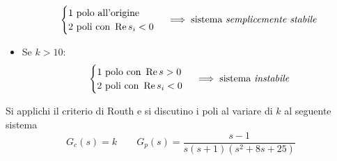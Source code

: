 \begin{itemize}
		\[\begin{cases}
			1 \text{ polo all'origine} \\
			2 \text{ poli con } \Re s_i < 0
		\end{cases} \implies \text{sistema \emph{semplicemente stabile}}\]
	\item Se \(k > 10\):
		\[\begin{cases}
			1 \text{ polo con } \Re s   > 0 \\
			2 \text{ poli con } \Re s_i < 0
		\end{cases} \implies \text{sistema \emph{instabile}}\]
\end{itemize}


 Si applichi il criterio di Routh e si discutino i
poli al variare di \(k\) al seguente sistema
\[
	G_c(s) = k \qquad G_p(s) = \frac{s-1}{s (s+1) (s^2 +8s +25)}
\]

